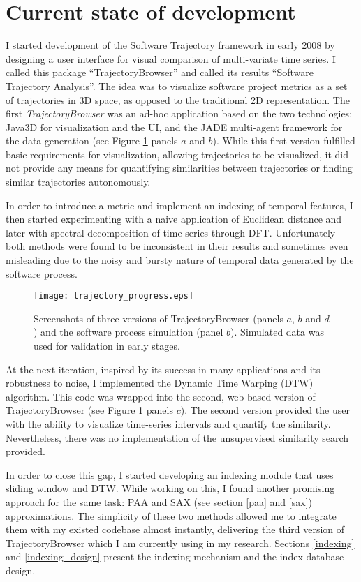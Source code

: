 \section{Current state of development}
I started development of the Software Trajectory framework in early 2008 by designing a user interface for visual comparison of multi-variate time series. I called this package ``TrajectoryBrowser'' and called its results ``Software Trajectory Analysis''. The idea was to visualize software project metrics as a set of trajectories in 3D space, as opposed to the traditional 2D representation. The first \textit{TrajectoryBrowser} was an ad-hoc application based on the two technologies: Java3D for visualization and the UI, and the JADE multi-agent framework \cite{citeulike:1230319} for the data generation (see Figure \ref{fig:trajectory_progress} panels $a$ and $b$). While this first version fulfilled basic requirements for visualization, allowing trajectories to be visualized, it did not provide any means for quantifying similarities between trajectories or finding similar trajectories autonomously.

In order to introduce a metric and implement an indexing of temporal features, I then started experimenting with a naive application of Euclidean distance and later with spectral decomposition of time series through DFT. Unfortunately both methods were found to be inconsistent in their results and sometimes even misleading due to the noisy and bursty nature of temporal data generated by the software process. 

\begin{figure}[tbp]
   \centering
   \texttt{[image: trajectory\_progress.eps]}
   \caption{Screenshots of three versions of TrajectoryBrowser (panels $a$, $b$ and $d$) and the software process simulation (panel $b$). Simulated data was used for validation in early stages.}
   \label{fig:trajectory_progress}
\end{figure}

At the next iteration, inspired by its success in many applications and its robustness to noise, I implemented the Dynamic Time Warping (DTW) algorithm. This code was wrapped into the second, web-based version of TrajectoryBrowser (see Figure \ref{fig:trajectory_progress} panels $c$). The second version provided the user with the ability to visualize time-series intervals and quantify the similarity. Nevertheless, there was no implementation of the unsupervised similarity search provided.

In order to close this gap, I started developing an indexing module that uses sliding window and DTW. While working on this, I found another promising approach for the same task: PAA and SAX (see section \ref{paa} and \ref{sax}) approximations. The simplicity of these two methods allowed me to integrate them with my existed codebase almost instantly, delivering the third version of TrajectoryBrowser which I am currently using in my research. Sections \ref{indexing} and \ref{indexing_design} present the indexing mechanism and the index database design. 

